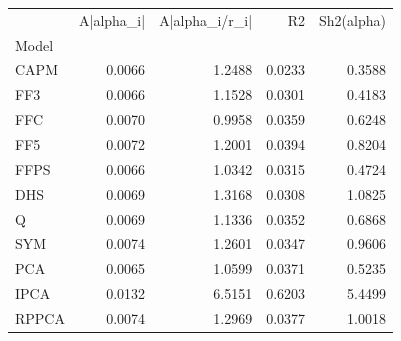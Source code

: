 \begin{tabular}{lrrrr}
\toprule
{} &  A|alpha\_i| &  A|alpha\_i/r\_i| &     R2 &  Sh2(alpha) \\
Model &             &                 &        &             \\
\midrule
CAPM  &      0.0066 &          1.2488 & 0.0233 &      0.3588 \\
FF3   &      0.0066 &          1.1528 & 0.0301 &      0.4183 \\
FFC   &      0.0070 &          0.9958 & 0.0359 &      0.6248 \\
FF5   &      0.0072 &          1.2001 & 0.0394 &      0.8204 \\
FFPS  &      0.0066 &          1.0342 & 0.0315 &      0.4724 \\
DHS   &      0.0069 &          1.3168 & 0.0308 &      1.0825 \\
Q     &      0.0069 &          1.1336 & 0.0352 &      0.6868 \\
SYM   &      0.0074 &          1.2601 & 0.0347 &      0.9606 \\
PCA   &      0.0065 &          1.0599 & 0.0371 &      0.5235 \\
IPCA  &      0.0132 &          6.5151 & 0.6203 &      5.4499 \\
RPPCA &      0.0074 &          1.2969 & 0.0377 &      1.0018 \\
\bottomrule
\end{tabular}

